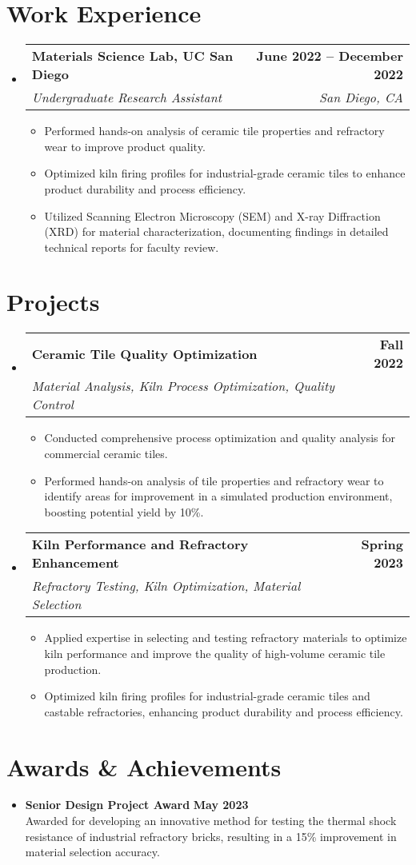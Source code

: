 \documentclass[letterpaper,11pt]{article}
\makeatletter
\newcommand{\resumeItem}[1]{
  \item\small{
    {#1 \vspace{-2pt}}
  }
}
\newcommand{\resumeSubheading}[4]{
  \vspace{-2pt}\item
    \begin{tabular*}{1.0\textwidth}[t]{l@{\extracolsep{\fill}}r}
      \textbf{#1} & \textbf{\small #2} \\
      \textit{\small#3} & \textit{\small #4} \\
    \end{tabular*}\vspace{-7pt}
}
\newcommand{\resumeSubHeadingListStart}{\begin{itemize}[leftmargin=0.0in, label={}]}
\newcommand{\resumeSubHeadingListEnd}{\end{itemize}}
\newcommand{\resumeItemListStart}{\begin{itemize}}
\newcommand{\resumeItemListEnd}{\end{itemize}\vspace{-5pt}}
\makeatother
\begin{document}
\section{Work Experience}
  \resumeSubHeadingListStart
    \resumeSubheading
      {Materials Science Lab, UC San Diego}{June 2022 -- December 2022}
      {Undergraduate Research Assistant}{San Diego, CA}
      \resumeItemListStart
        \resumeItem{Performed hands-on analysis of ceramic tile properties and refractory wear to improve product quality.}
        \resumeItem{Optimized kiln firing profiles for industrial-grade ceramic tiles to enhance product durability and process efficiency.}
        \resumeItem{Utilized Scanning Electron Microscopy (SEM) and X-ray Diffraction (XRD) for material characterization, documenting findings in detailed technical reports for faculty review.}
      \resumeItemListEnd
    \resumeSubHeadingListEnd
\vspace{-16pt}

\section{Projects}
  \resumeSubHeadingListStart
    \resumeSubheading
      {Ceramic Tile Quality Optimization}{Fall 2022}
      {Material Analysis, Kiln Process Optimization, Quality Control}{}
      \resumeItemListStart
        \resumeItem{Conducted comprehensive process optimization and quality analysis for commercial ceramic tiles.}
        \resumeItem{Performed hands-on analysis of tile properties and refractory wear to identify areas for improvement in a simulated production environment, boosting potential yield by 10\%.}
    \resumeItemListEnd
    
    \resumeSubheading
      {Kiln Performance and Refractory Enhancement}{Spring 2023}
      {Refractory Testing, Kiln Optimization, Material Selection}{}
      \resumeItemListStart
        \resumeItem{Applied expertise in selecting and testing refractory materials to optimize kiln performance and improve the quality of high-volume ceramic tile production.}
        \resumeItem{Optimized kiln firing profiles for industrial-grade ceramic tiles and castable refractories, enhancing product durability and process efficiency.}
      \resumeItemListEnd
  \resumeSubHeadingListEnd
\vspace{-16pt}

\section{Awards \& Achievements}
\begin{itemize}[leftmargin=0.35in, itemsep=0pt, label={\tiny$\bullet$}]
    \item \small\textbf{Senior Design Project Award} \hfill \small\textbf{May 2023} \\
    Awarded for developing an innovative method for testing the thermal shock resistance of industrial refractory bricks, resulting in a 15\% improvement in material selection accuracy.
\end{itemize}
   
\end{document}
